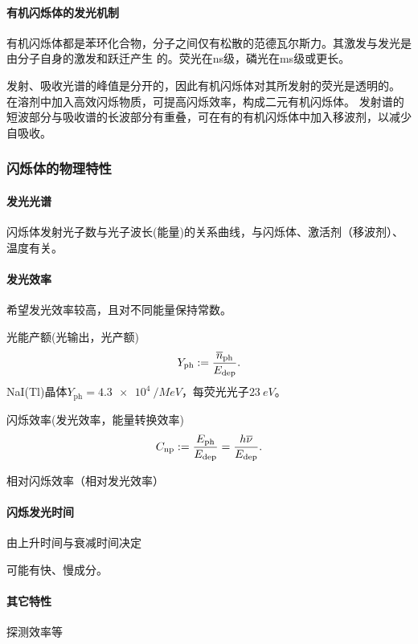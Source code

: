 \paragraph{有机闪烁体的发光机制}
有机闪烁体都是苯环化合物，分子之间仅有松散的范德瓦尔斯力。其激发与发光是由分子自身的激发和跃迁产生
的。荧光在ns级，磷光在ms级或更长。

发射、吸收光谱的峰值是分开的，因此有机闪烁体对其所发射的荧光是透明的。
在溶剂中加入高效闪烁物质，可提高闪烁效率，构成二元有机闪烁体。
发射谱的短波部分与吸收谱的长波部分有重叠，可在有的有机闪烁体中加入移波剂，以减少自吸收。
\subsubsection{闪烁体的物理特性}
\paragraph{发光光谱}
闪烁体发射光子数与光子波长(能量)的关系曲线，与闪烁体、激活剂（移波剂）、温度有关。
\paragraph{发光效率}
希望发光效率较高，且对不同能量保持常数。
\begin{compactenum}
	\item 光能产额(光输出，光产额)
	\[
		Y_{\mathrm{ph}}:=\frac{\overline n_{\mathrm{ph}}}{E_{\mathrm{dep}}}.
	\]
	NaI(Tl)晶体$Y_{\mathrm{ph}}=\SI{4.3e4}{/MeV}$，每荧光光子$\SI{23}{eV}$。
	\item 闪烁效率(发光效率，能量转换效率)
	\[
		C_{\mathrm{np}}:=\frac{E_{\mathrm{ph}}}{E_{\mathrm{dep}}}=\frac{h\overline\nu}{E_{\mathrm{dep}}}.
	\]
	\item 相对闪烁效率（相对发光效率）
\end{compactenum}
\paragraph{闪烁发光时间}
由上升时间与衰减时间决定

可能有快、慢成分。
\paragraph{其它特性}
探测效率等
